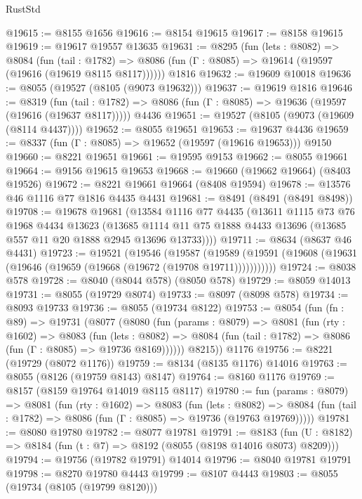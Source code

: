 \begin{lexlean}{RustStd}
\begin{coremodule}
@19615 := @8155 @1656
@19616 := @8154 @19615
@19617 := @8158 @19615
@19619 := @19617 @19557 @13635
@19631 := @8295
    (fun (lets : @8082) =>
    @8084
      (fun (tail : @1782) =>
      @8086 (fun (Γ : @8085) => @19614 (@19597 (@19616 (@19619 @8115 @8117))))))
    @1816
@19632 := @19609 @10018
@19636 := @8055 (@19527 (@8105 (@9073 @19632)))
@19637 := @19619 @1816
@19646 := @8319
    (fun (tail : @1782) => @8086 (fun (Γ : @8085) => @19636 (@19597 (@19616 (@19637 @8117)))))
    @4436
@19651 := @19527 (@8105 (@9073 (@19609 (@8114 @4437))))
@19652 := @8055 @19651
@19653 := @19637 @4436
@19659 := @8337 (fun (Γ : @8085) => @19652 (@19597 (@19616 @19653))) @9150
@19660 := @8221 @19651
@19661 := @19595 @9153
@19662 := @8055 @19661
@19664 := @9156 @19615 @19653
@19668 := @19660 (@19662 @19664) (@8403 @19526)
@19672 := @8221 @19661 @19664 (@8408 @19594)
@19678 := @13576 @46 @1116 @77 @1816 @4435 @4431
@19681 := @8491 (@8491 (@8491 @8498))
@19708 := @19678
    @19681
    (@13584
      @1116
      @77
      @4435
      (@13611
        @1115
        @73
        @76
        @1968
        @4434
        @13623
        (@13685 @1114 @11 @75 @1888 @4433 @13696 (@13685 @557 @11 @20 @1888 @2945 @13696 @13733))))
@19711 := @8634 (@8637 @46 @4431)
@19723 := @19521
    (@19546
      (@19587
        (@19589 (@19591 (@19608 (@19631 (@19646 (@19659 (@19668 (@19672 (@19708 @19711)))))))))))
@19724 := @8038 @578
@19728 := @8040 (@8044 @578) (@8050 @578)
@19729 := @8059 @14013
@19731 := @8055 (@19729 @8074)
@19733 := @8097 (@8098 @578)
@19734 := @8093 @19733
@19736 := @8055 (@19734 @8122)
@19753 := @8054
    (fun (fn : @89) =>
    @19731
      (@8077
        (@8080
          (fun (params : @8079) =>
          @8081
            (fun (rty : @1602) =>
            @8083
              (fun (lets : @8082) =>
              @8084 (fun (tail : @1782) => @8086 (fun (Γ : @8085) => @19736 @8169))))))
        @8215))
    @1176
@19756 := @8221 (@19729 (@8072 @1176))
@19759 := @8134 (@8135 @1176) @14016
@19763 := @8055 (@8126 (@19759 @8143) @8147)
@19764 := @8160 @1176
@19769 := @8157 (@8159 @19764 @14019 @8115 @8117)
@19780 := fun (params : @8079) =>
  @8081
    (fun (rty : @1602) =>
    @8083
      (fun (lets : @8082) =>
      @8084 (fun (tail : @1782) => @8086 (fun (Γ : @8085) => @19736 (@19763 @19769)))))
@19781 := @8080 @19780
@19782 := @8077 @19781
@19791 := @8183
    (fun (U : @8182) => @8184 (fun (t : @7) => @8192 (@8055 (@8198 @14016 @8073) @8209)))
@19794 := @19756 (@19782 @19791) @14014
@19796 := @8040 @19781 @19791
@19798 := @8270 @19780 @4443
@19799 := @8107 @4443
@19803 := @8055 (@19734 (@8105 (@19799 @8120)))

\end{coremodule}
\end{lexlean}

